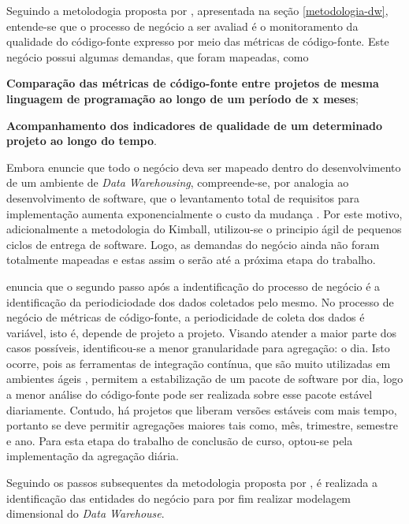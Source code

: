 Seguindo a metolodogia proposta por , apresentada na seção \ref{metodologia-dw}, entende-se que o processo de negócio a ser avaliad é o monitoramento da qualidade do código-fonte expresso por meio das métricas de código-fonte. Este negócio possui algumas demandas, que foram mapeadas, como \begin{inparaenum}[i)] \item 
\textbf{Comparação das métricas de código-fonte entre projetos de mesma linguagem de programação ao longo de um período de x meses}; \item \textbf{Acompanhamento dos indicadores de qualidade de um determinado projeto ao longo do tempo}.
\end{inparaenum} 
Embora  enuncie que todo o negócio deva ser mapeado dentro do desenvolvimento de um ambiente de \textit{Data Warehousing}, compreende-se, por analogia ao desenvolvimento de software, que o levantamento total de requisitos para implementação aumenta exponencialmente o custo da mudança \cite{beck1999}. Por este motivo, adicionalmente a metodologia do Kimball, utilizou-se o principio ágil de pequenos ciclos de entrega de software. Logo, as demandas do negócio ainda não foram totalmente mapeadas e estas assim o serão até a próxima etapa do trabalho.


 enuncia que o segundo passo após a indentificação do processo de negócio é a identificação da periodiciodade dos dados coletados pelo mesmo. No processo de negócio de métricas de código-fonte, a periodicidade de coleta dos dados é variável, isto é, depende de projeto a projeto. Visando atender a maior parte dos casos possíveis, identificou-se a menor granularidade para agregação: o dia. Isto ocorre, pois as ferramentas de integração contínua, que são muito utilizadas em ambientes ágeis \cite{beckarticle1999}, permitem a estabilização de um pacote de software por dia, logo a menor análise do código-fonte pode ser realizada sobre esse pacote estável diariamente. Contudo, há projetos que liberam versões estáveis com mais tempo, portanto se deve permitir agregações maiores tais como, mês, trimestre, semestre e ano. Para esta etapa do trabalho de conclusão de curso, optou-se pela implementação da agregação diária.


Seguindo os passos subsequentes da metodologia proposta por , é realizada a identificação das entidades do negócio para por fim realizar modelagem dimensional do \textit{Data Warehouse}. 


